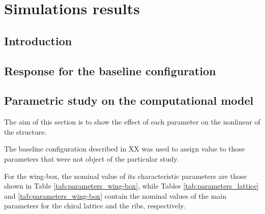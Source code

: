 \chapter{Simulations results} \label{chap:results_sim}

\section{Introduction} \label{sec:intro_results_sim}


\section{Response for the baseline configuration} \label{sec:baselineResponse_results_sim}

\section{Parametric study on the computational model} \label{sec:computationalParametricStudy_results_sim}
  The aim of this section is to show the effect of each parameter on the nonlinear of the structure.

  The baseline configuration described in XX was used to assign value to those parameters that were not object of the particular study.

  For the wing-box, the nominal value of its characteristic parameters are those shown in Table \ref{tab:parameters_wing-box}, while Tables \ref{tab:parameters_lattice} and \ref{tab:parameters_wing-box} contain the nominal values of the main parameters for the chiral lattice and the ribs, respectively.

